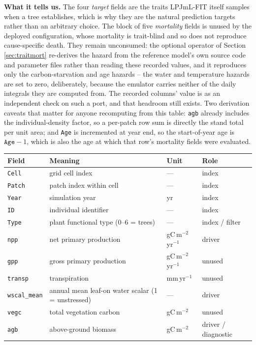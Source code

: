 \documentclass[11pt]{article}
\begin{document}
\begin{table}[h]
{\textbf{What it tells us.} The four \emph{target} fields are the traits LPJmL-FIT itself samples when a tree establishes, which is why they are the natural prediction targets rather than an arbitrary choice. The block of five \emph{mortality} fields is unused by the deployed configuration, whose mortality is trait-blind and so does not reproduce cause-specific death. They remain unconsumed: the optional operator of Section \ref{sec:traitmort} re-derives the hazard from the reference model's own source code and parameter files rather than reading these recorded values, and it reproduces only the carbon-starvation and age hazards -- the water and temperature hazards are set to zero, deliberately, because the emulator carries neither of the daily integrals they are computed from. The recorded columns' value is as an independent check on such a port, and that headroom still exists. Two derivation caveats that matter for anyone recomputing from this table: \texttt{agb} already includes the individual-density factor, so a per-patch row sum is directly the stand total per unit area; and \texttt{Age} is incremented at year end, so the start-of-year age is $\texttt{Age}-1$, which is also the age at which that row's mortality fields were evaluated.}
\label{tab:recorded}
\small
\begin{tabular}{llll}
\toprule
Field & Meaning & Unit & Role \\
\midrule
\texttt{Cell} & grid cell index & --- & index \\
\texttt{Patch} & patch index within cell & --- & index \\
\texttt{Year} & simulation year & yr & index \\
\texttt{ID} & individual identifier & --- & index \\
\texttt{Type} & plant functional type (0--6 = trees) & --- & index / filter \\
\midrule
\texttt{npp} & net primary production & gC\,m$^{-2}$\,yr$^{-1}$ & driver \\
\texttt{gpp} & gross primary production & gC\,m$^{-2}$\,yr$^{-1}$ & unused \\
\texttt{transp} & transpiration & mm\,yr$^{-1}$ & unused \\
\texttt{wscal\_mean} & annual mean leaf-on water scalar (1 = unstressed) & --- & driver \\
\texttt{vegc} & total vegetation carbon & gC\,m$^{-2}$ & unused \\
\texttt{agb} & above-ground biomass & gC\,m$^{-2}$ & driver / diagnostic \\

\end{tabular}
\end{table}
\end{document}
